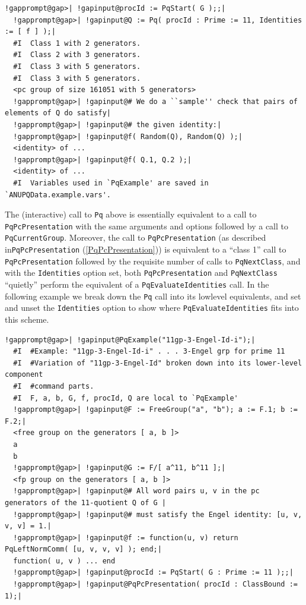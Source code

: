 \documentclass[a4paper,11pt]{report}
\begin{document}
{{\begin{Verbatim}[commandchars=!@|,fontsize=\small,frame=single,label=Example]
  !gapprompt@gap>| !gapinput@procId := PqStart( G );;|
  !gapprompt@gap>| !gapinput@Q := Pq( procId : Prime := 11, Identities := [ f ] );|
  #I  Class 1 with 2 generators.
  #I  Class 2 with 3 generators.
  #I  Class 3 with 5 generators.
  #I  Class 3 with 5 generators.
  <pc group of size 161051 with 5 generators>
  !gapprompt@gap>| !gapinput@# We do a ``sample'' check that pairs of elements of Q do satisfy|
  !gapprompt@gap>| !gapinput@# the given identity:|
  !gapprompt@gap>| !gapinput@f( Random(Q), Random(Q) );|
  <identity> of ...
  !gapprompt@gap>| !gapinput@f( Q.1, Q.2 );|
  <identity> of ...
  #I  Variables used in `PqExample' are saved in `ANUPQData.example.vars'.
\end{Verbatim}
 The (interactive) call to \texttt{Pq} above is essentially equivalent to a call to \texttt{PqPcPresentation} with the same arguments and options followed by a call to \texttt{PqCurrentGroup}. Moreover, the call to \texttt{PqPcPresentation} (as described in{\nobreakspace}\texttt{PqPcPresentation} (\ref{PqPcPresentation})) is equivalent to a ``class 1'' call to \texttt{PqPcPresentation} followed by the requisite number of calls to \texttt{PqNextClass}, and with the \texttt{Identities} option set, both \texttt{PqPcPresentation} and \texttt{PqNextClass} ``quietly'' perform the equivalent of a \texttt{PqEvaluateIdentities} call. In the following example we break down the \texttt{Pq} call into its low\texttt{}level equivalents, and set and unset the \texttt{Identities} option to show where \texttt{PqEvaluateIdentities} fits into this scheme. 
\begin{Verbatim}[commandchars=!@|,fontsize=\small,frame=single,label=Example]
  !gapprompt@gap>| !gapinput@PqExample("11gp-3-Engel-Id-i");|
  #I  #Example: "11gp-3-Engel-Id-i" . . . 3-Engel grp for prime 11
  #I  #Variation of "11gp-3-Engel-Id" broken down into its lower-level component
  #I  #command parts.
  #I  F, a, b, G, f, procId, Q are local to `PqExample'
  !gapprompt@gap>| !gapinput@F := FreeGroup("a", "b"); a := F.1; b := F.2;|
  <free group on the generators [ a, b ]>
  a
  b
  !gapprompt@gap>| !gapinput@G := F/[ a^11, b^11 ];|
  <fp group on the generators [ a, b ]>
  !gapprompt@gap>| !gapinput@# All word pairs u, v in the pc generators of the 11-quotient Q of G |
  !gapprompt@gap>| !gapinput@# must satisfy the Engel identity: [u, v, v, v] = 1.|
  !gapprompt@gap>| !gapinput@f := function(u, v) return PqLeftNormComm( [u, v, v, v] ); end;|
  function( u, v ) ... end
  !gapprompt@gap>| !gapinput@procId := PqStart( G : Prime := 11 );;|
  !gapprompt@gap>| !gapinput@PqPcPresentation( procId : ClassBound := 1);|

\end{Verbatim}}}
\end{document}
